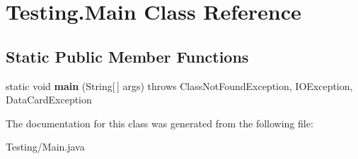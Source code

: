\hypertarget{class_testing_1_1_main}{}\section{Testing.\+Main Class Reference}
\label{class_testing_1_1_main}
\subsection*{Static Public Member Functions}
\begin{DoxyCompactItemize}
\item 
\mbox{\label{class_testing_1_1_main_a1f0eb515fa1b5d53d7b4e66dc6ff4625}} 
static void {\bfseries main} (String\mbox{[}$\,$\mbox{]} args)  throws Class\+Not\+Found\+Exception, I\+O\+Exception, Data\+Card\+Exception 
\end{DoxyCompactItemize}


The documentation for this class was generated from the following file\+:\begin{DoxyCompactItemize}
\item 
Testing/Main.\+java\end{DoxyCompactItemize}
